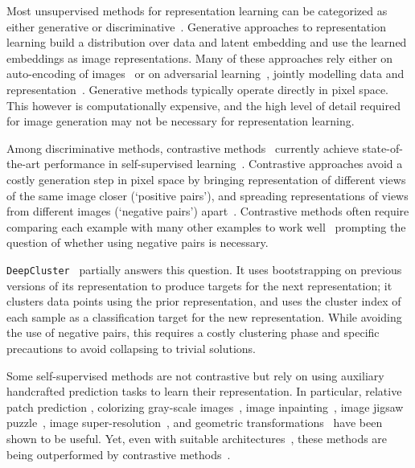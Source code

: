 Most unsupervised methods for representation learning can be categorized as either generative or discriminative~\cite{doersch2015unsupervised, SimCLR}. 
Generative approaches to representation learning build a distribution over data and latent embedding and use the learned embeddings as image representations. Many of these approaches rely either on auto-encoding of images~\cite{vincent2008extracting, KingmaVAE, RezendeVAE} or on adversarial learning~\cite{GAN}, jointly modelling data and representation~\cite{donahue2016adversarial, DumoulinALI, BigBiGAN, BrockBigGAN}. Generative methods typically operate directly in pixel space. This however is computationally expensive, and the high level of detail required for image generation may not be necessary for representation learning.

Among discriminative methods, contrastive methods~\cite{MOCO, CPC, CPCv2, DIM, AMDIM, CMC, PIRL, li2020prototypical}
currently achieve state-of-the-art performance in self-supervised learning~\cite{MOCOv2, SimCLR,chen2020big,Tian2020WhatMF}. Contrastive approaches avoid a costly generation step in pixel space by bringing representation of different views of the same image closer (`positive pairs'), and spreading representations of views from different images (`negative pairs') apart~\cite{wu2018unsupervised, doersch2017multi}. Contrastive methods often require comparing each example with many other examples to work well~\cite{MOCO, SimCLR} prompting the question of whether using negative pairs is necessary. 

\texttt{DeepCluster}~\cite{caron2018DeepCF} partially answers this question. It uses bootstrapping on previous versions of its representation to produce targets for the next representation; it clusters data points using the prior representation, and uses the cluster index of each sample as a classification target for the new representation. While avoiding the use of negative pairs, this requires a costly clustering phase and specific precautions to avoid collapsing to trivial solutions. 

Some self-supervised methods are not contrastive but rely on using auxiliary handcrafted prediction tasks to learn their representation. In particular, relative patch prediction \cite{doersch2015unsupervised,doersch2017multi}, colorizing gray-scale images~\cite{Zhang2016ColorfulIC, larsson2016learning}, image inpainting~\cite{pathak2016context}, image jigsaw puzzle~\cite{noroozi2016unsupervised}, image super-resolution~\cite{ledig2017photo}, and geometric transformations~\cite{dosovitskiy2014discriminative, gidaris2018unsupervised} have been shown to be useful. Yet, even with suitable architectures~\cite{kolesnikov2019revisiting}, these methods are being outperformed by contrastive methods~\cite{MOCOv2, SimCLR, Tian2020WhatMF}.

